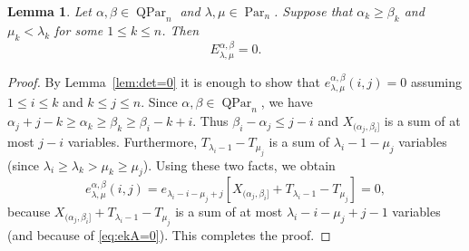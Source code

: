 \documentclass[12pt]{amsart}
\numberwithin{equation}{section}
\newtheorem{lem}[thm]{Lemma}
\theoremstyle{definition}
\newcommand\Par{\operatorname{Par}}
\newcommand\QPar{\operatorname{QPar}}
\begin{document}
\begin{lem}\label{lem:E=0}
  Let $\alpha,\beta\in\QPar_n$ and $\lambda,\mu\in\Par_n$. Suppose that
  $\alpha_k\ge \beta_k$ and $\mu_k<\lambda_k$ for some $1\le k\le n$. Then
\[
  E^{\alpha,\beta}_{\lambda,\mu} = 0.
\] 
\end{lem}
\begin{proof}
  By Lemma~\ref{lem:det=0} it is enough to show that
  $e^{\alpha,\beta}_{\lambda,\mu}(i,j)=0$ assuming $1\le i\le k$ and $k\le j\le
  n$. Since $\alpha,\beta\in\QPar_n$, we have $\alpha_j
  +j-k\ge\alpha_k\ge\beta_k\ge\beta_i-k+i$. Thus $\beta_i-\alpha_j\le j-i$ and
  $X_{(\alpha_j,\beta_i]}$ is a sum of at most $j-i$ variables. Furthermore,
  $T_{\lambda_i-1}-T_{\mu_j}$ is a sum of $\lambda_i - 1 - \mu_j$ variables
  (since $\lambda_i\ge\lambda_k>\mu_k\ge\mu_j$). Using these two facts, we
  obtain
  \[
    e^{\alpha,\beta}_{\lambda,\mu}(i,j)
    =e_{\lambda_i-i-\mu_j+j}[X_{(\alpha_j,\beta_i]} + T_{\lambda_i-1}-T_{\mu_j}]
    = 0,
  \]
  because $X_{(\alpha_j,\beta_i]} + T_{\lambda_i-1}-T_{\mu_j}$ is a sum of at
  most $\lambda_i-i-\mu_j+j-1$ variables
  (and because of \eqref{eq:ekA=0}). This completes the proof.
\end{proof}
\end{document}
